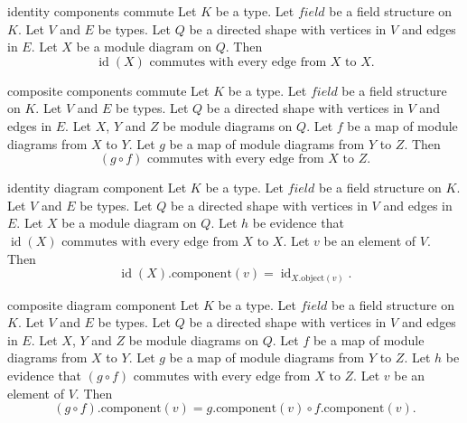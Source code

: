 \begin{cleanresult}{identity components commute}
Let $K$ be a type.
Let $\mathit{field}$ be a field structure on $K$.
Let $V$ and $E$ be types.
Let $Q$ be a directed shape with vertices in $V$ and edges in $E$.
Let $X$ be a module diagram on $Q$.
Then \[\operatorname{id}(X)\text{ commutes with every edge from }X\text{ to }X.\]
\end{cleanresult}

\begin{cleanresult}{composite components commute}
Let $K$ be a type.
Let $\mathit{field}$ be a field structure on $K$.
Let $V$ and $E$ be types.
Let $Q$ be a directed shape with vertices in $V$ and edges in $E$.
Let $X$, $Y$ and $Z$ be module diagrams on $Q$.
Let $f$ be a map of module diagrams from $X$ to $Y$.
Let $g$ be a map of module diagrams from $Y$ to $Z$.
Then \[(g \circ f)\text{ commutes with every edge from }X\text{ to }Z.\]
\end{cleanresult}

\begin{cleanresult}{identity diagram component}
Let $K$ be a type.
Let $\mathit{field}$ be a field structure on $K$.
Let $V$ and $E$ be types.
Let $Q$ be a directed shape with vertices in $V$ and edges in $E$.
Let $X$ be a module diagram on $Q$.
Let $h$ be evidence that $\operatorname{id}(X)\text{ commutes with every edge from }X\text{ to }X$.
Let $v$ be an element of $V$.
Then \[\operatorname{id}(X).\mathrm{component}(v) = \operatorname{id}_{X.\mathrm{object}(v)}.\]
\end{cleanresult}

\begin{cleanresult}{composite diagram component}
Let $K$ be a type.
Let $\mathit{field}$ be a field structure on $K$.
Let $V$ and $E$ be types.
Let $Q$ be a directed shape with vertices in $V$ and edges in $E$.
Let $X$, $Y$ and $Z$ be module diagrams on $Q$.
Let $f$ be a map of module diagrams from $X$ to $Y$.
Let $g$ be a map of module diagrams from $Y$ to $Z$.
Let $h$ be evidence that $(g \circ f)\text{ commutes with every edge from }X\text{ to }Z$.
Let $v$ be an element of $V$.
Then \[(g \circ f).\mathrm{component}(v) = g.\mathrm{component}(v) \circ f.\mathrm{component}(v).\]
\end{cleanresult}


